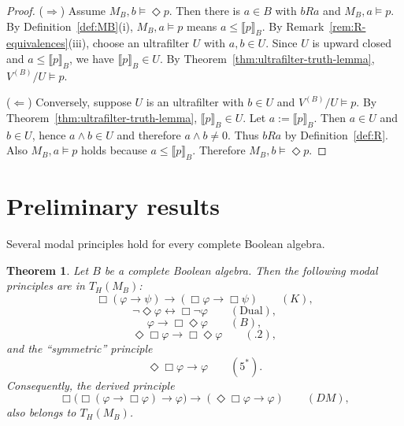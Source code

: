 \documentclass[11pt]{amsart}
\theoremstyle{definition}
\theoremstyle{plain}
\newtheorem{theorem}[definition]{Theorem}
\newcommand{\val}[1]{\llbracket #1\rrbracket_B}
\begin{document}
\begin{proof}
($\Rightarrow$) Assume $M_B,b\models \Diamond p$. Then there is $a\in B$ with $bRa$ and $M_B,a\models p$.
By Definition~\ref{def:MB}(i), $M_B,a\models p$ means $a\le \val{p}$.
By Remark~\ref{rem:R-equivalences}(iii), choose an ultrafilter $U$ with $a,b\in U$.
Since $U$ is upward closed and $a\le \val{p}$, we have $\val{p}\in U$.
By Theorem~\ref{thm:ultrafilter-truth-lemma}, $V^{(B)}/U\models p$.

($\Leftarrow$) Conversely, suppose $U$ is an ultrafilter with $b\in U$ and $V^{(B)}/U\models p$.
By Theorem~\ref{thm:ultrafilter-truth-lemma}, $\val{p}\in U$.
Let $a:=\val{p}$. Then $a\in U$ and $b\in U$, hence $a\wedge b\in U$ and therefore $a\wedge b\neq 0$.
Thus $bRa$ by Definition~\ref{def:R}.
Also $M_B,a\models p$ holds because $a\le \val{p}$.
Therefore $M_B,b\models \Diamond p$.
\end{proof}

\section{Preliminary results}\label{sec:results}

Several modal principles hold for every complete Boolean algebra.

\begin{theorem}\label{thm:general-valid}
Let $B$ be a complete Boolean algebra. Then the following modal principles are in $T_H(M_B)$:
\[
\Box(\varphi\to\psi)\to (\Box\varphi\to \Box\psi)\qquad (K),
\]
\[
\neg\Diamond\varphi \leftrightarrow \Box\neg\varphi \qquad (\mathrm{Dual}),
\]
\[
\varphi \to \Box\Diamond\varphi \qquad (B),
\]
\[
\Diamond\Box\varphi \to \Box\Diamond\varphi\qquad (.2),
\]
and the ``symmetric'' principle
\[
\Diamond\Box\varphi \to \varphi \qquad (5^\ast).
\]
Consequently, the derived principle
\[
\Box\bigl(\Box(\varphi\to\Box\varphi)\to\varphi\bigr)\to(\Diamond\Box\varphi\to\varphi)\qquad (DM),
\]
also belongs to $T_H(M_B)$.
\end{theorem}
\end{document}

